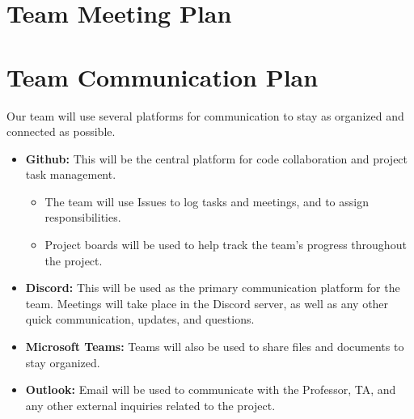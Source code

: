 \documentclass{article}
\begin{document}

\section{Team Meeting Plan}






\section{Team Communication Plan}

Our team will use several platforms for communication to stay as organized and connected as possible.
\begin{itemize}
	\item {\bf Github:} This will be the central platform for code collaboration and project task management. 
	\begin{itemize}
    \item The team will use Issues to log tasks and meetings, and to assign responsibilities.
    \item Project boards will be used to help track the team's progress throughout the project.
  \end{itemize}
  \item {\bf Discord:} This will be used as the primary communication platform for the team. 
        Meetings will take place in the Discord server, as well as any other quick communication, updates, and questions.
  \item {\bf Microsoft Teams:} Teams will also be used to share files and documents to stay organized.
  \item {\bf Outlook:} Email will be used to communicate with the Professor, TA, and any other external inquiries related to the project.
\end{itemize}
\end{document}
